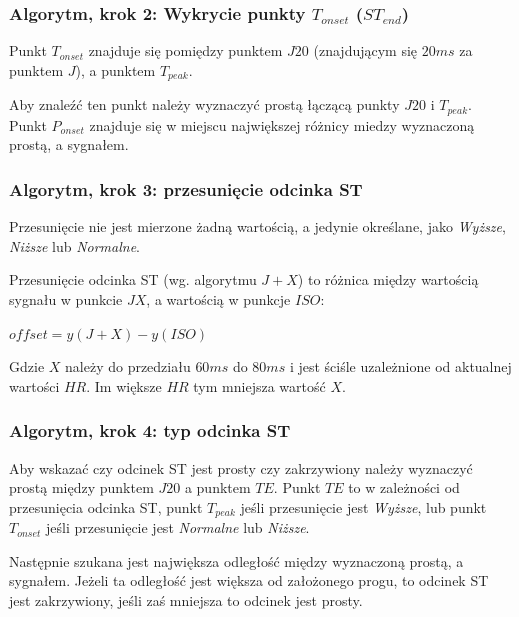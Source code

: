 \documentclass{beamer}
\begin{document}
\begin{frame}
  \frametitle{Algorytm, krok 2: Wykrycie punkty $T_{onset}$ ($ST_{end}$)}

  Punkt $T_{onset}$ znajduje się pomiędzy punktem $J20$ (znajdującym się $20ms$
  za punktem $J$), a punktem $T_{peak}$.

  Aby znaleźć ten punkt należy wyznaczyć prostą łączącą punkty $J20$ i
  $T_{peak}$. Punkt $P_{onset}$ znajduje się w miejscu największej różnicy
  miedzy wyznaczoną prostą, a sygnałem.

\end{frame}

\begin{frame}
  \frametitle{Algorytm, krok 3: przesunięcie odcinka ST}

  Przesunięcie nie jest mierzone żadną wartością, a jedynie określane, jako
  \emph{Wyższe}, \emph{Niższe} lub \emph{Normalne}.

  Przesunięcie odcinka ST (wg. algorytmu $J+X$) to różnica między wartością
  sygnału w punkcie $JX$, a wartością w punkcje $ISO$:

  \begin{center}
  \begin{math}
    offset = y(J+X) - y(ISO)
  \end{math}
  \end{center}

  Gdzie $X$ należy do przedziału $60ms$ do $80ms$ i jest ściśle uzależnione 
  od aktualnej wartości $HR$. Im większe $HR$ tym mniejsza wartość $X$.
\end{frame}

\begin{frame}
  \frametitle{Algorytm, krok 4: typ odcinka ST}

  Aby wskazać czy odcinek ST jest prosty czy zakrzywiony należy wyznaczyć
  prostą między punktem $J20$ a punktem $TE$. Punkt $TE$ to w zależności od
  przesunięcia odcinka ST, punkt $T_{peak}$ jeśli przesunięcie jest
  \emph{Wyższe}, lub punkt $T_{onset}$ jeśli przesunięcie jest \emph{Normalne}
  lub \emph{Niższe}.

  Następnie szukana jest największa odległość między wyznaczoną prostą, a
  sygnałem. Jeżeli ta odległość jest większa od założonego progu, to odcinek ST
  jest zakrzywiony, jeśli zaś mniejsza to odcinek jest prosty.
\end{frame}
\end{document}
